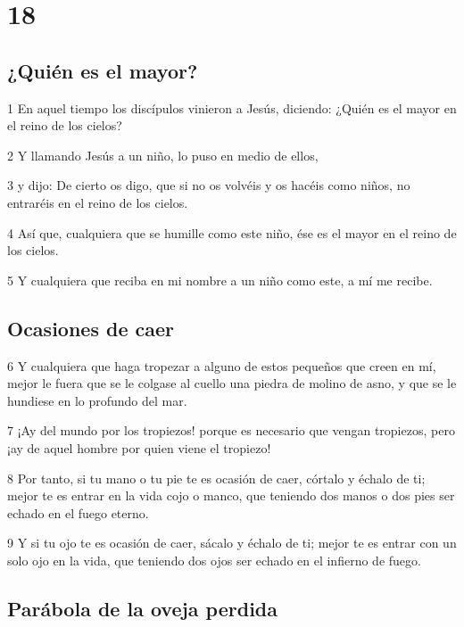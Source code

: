 \chapter{18}

\section*{¿Quién es el mayor?}

\par 1 En aquel tiempo los discípulos vinieron a Jesús, diciendo: ¿Quién es el mayor en el reino de los cielos?
\par 2 Y llamando Jesús a un niño, lo puso en medio de ellos,
\par 3 y dijo: De cierto os digo, que si no os volvéis y os hacéis como niños, no entraréis en el reino de los cielos.
\par 4 Así que, cualquiera que se humille como este niño, ése es el mayor en el reino de los cielos.
\par 5 Y cualquiera que reciba en mi nombre a un niño como este, a mí me recibe.

\section*{Ocasiones de caer}

\par 6 Y cualquiera que haga tropezar a alguno de estos pequeños que creen en mí, mejor le fuera que se le colgase al cuello una piedra de molino de asno, y que se le hundiese en lo profundo del mar.
\par 7 ¡Ay del mundo por los tropiezos! porque es necesario que vengan tropiezos, pero ¡ay de aquel hombre por quien viene el tropiezo!
\par 8 Por tanto, si tu mano o tu pie te es ocasión de caer, córtalo y échalo de ti; mejor te es entrar en la vida cojo o manco, que teniendo dos manos o dos pies ser echado en el fuego eterno.
\par 9 Y si tu ojo te es ocasión de caer, sácalo y échalo de ti; mejor te es entrar con un solo ojo en la vida, que teniendo dos ojos ser echado en el infierno de fuego.

\section*{Parábola de la oveja perdida}

